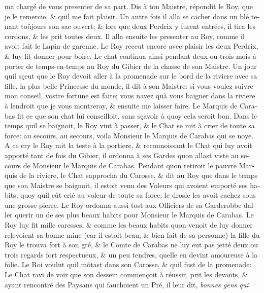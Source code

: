 \documentclass[14pt,a4paper]{memoir}
\begin{document}
\begin{otherlanguage}{french}
m\textquotesingle a chargé de vous presenter de sa part. Dis à ton
Maistre, répondit le Roy, que je le remercie, \& qu\textquotesingle il
me fait plaisir. Un autre fois il alla se cacher dans un blé tenant
toûjours son sac ouvert; \& lors que deux Perdrix y furent entrées, il
tira les cordons, \& les prit toutes deux. Il alla ensuite les presenter
au Roy, comme il avoit fait le Lapin de garenne. Le Roy receut encore
avec plaisir les deux Perdrix, \& luy fit donner pour boire. Le chat
continua ainsi pendant deux ou trois mois à porter de temps-en-temps au
Roy du Gibier de la chasse de son Maistre. Un jour qu\textquotesingle il
sçeut que le Roy devoit aller à la promenade sur le bord de la riviere
avec sa fille, la plus belle Princesse du monde, il dit à son Maistre:
si vous voulez suivre mon conseil, vostre fortune est faite; vous
n\textquotesingle avez qu\textquotesingle à vous baigner dans la riviere
à l\textquotesingle endroit que je vous montreray, \& ensuite me laisser
faire. Le Marquis de Carabas fit ce que son chat lui conseilloit, sans
sçavoir à quoy cela seroit bon. Dans le temps qu\textquotesingle il se
baignoit, le Roy vint à passer, \& le Chat se mit à crier de toute sa
force: au secours, au secours, voila Monsieur le Marquis de Carabas qui
se noye. A ce cry le Roy mit la teste à la portiere, \& reconnoissant le
Chat qui luy avoit apporté tant de fois du Gibier, il ordonna à ses
Gardes qu\textquotesingle on allast viste au secours de Monsieur le
Marquis de Carabas. Pendant qu\textquotesingle on retiroit le pauvre
Marquis de la riviere, le Chat s\textquotesingle approcha du Carosse, \&
dit au Roy que dans le temps que son Maistre se baignoit, il estoit venu
des Voleurs qui avoient emporté ses habits, quoy qu\textquotesingle il
eût crié au voleur de toute sa force; le drosle les avoit cachez sous
une grosse pierre. Le Roy ordonna aussi-tost aux Officiers de sa
Garderobbe d\textquotesingle aller querir un de ses plus beaux habits
pour Monsieur le Marquis de Carabas. Le Roy luy fit mille caresses, \&
comme les beaux habits qu\textquotesingle on venoit de luy donner
relevoient sa bonne mine (car il estoit beau; \& bien fait de sa
personne) la fille du Roy le trouva fort à son gré, \& le Comte de
Carabas ne luy eut pas jetté deux ou trois regards fort respectueux, \&
un peu tendres, qu\textquotesingle elle en devint amoureuse à la folie.
Le Roi voulut qu\textquotesingle il mõtast dans son Carosse, \&
qu\textquotesingle il fust de la promenade: Le Chat ravi de voir que son
dessein commençoit à réussir, prit les devants, \& ayant rencontré des
Paysans qui fauchoient un Pré, il leur dit, \emph{bonnes gens qui
}
\end{otherlanguage}
\end{document}
